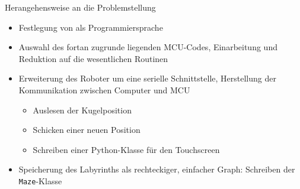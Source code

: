 \documentclass{beamer}
\begin{document}
\begin{frame}[fragile,t]{Herangehensweise an die Problemstellung}
\begin{itemize}
\item Festlegung von  als Programmiersprache
\item Auswahl des fortan zugrunde liegenden MCU-Codes, Einarbeitung und Reduktion auf die wesentlichen Routinen
\item Erweiterung des Roboter um eine serielle Schnittstelle, Herstellung der Kommunikation zwischen Computer und MCU
\begin{itemize}
\item Auslesen der Kugelposition
\item Schicken einer neuen Position
\item Schreiben einer Python-Klasse für den Touchscreen
\end{itemize}
\item Speicherung des Labyrinths als rechteckiger, einfacher Graph: Schreiben der \verb~Maze~-Klasse
\end{itemize}
\begin{figure}[h]
  \centering
\end{figure}
\end{frame}
\end{document}
